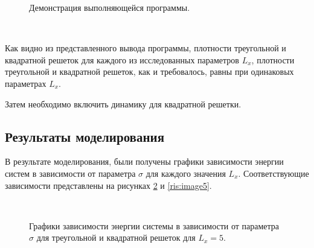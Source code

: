 \documentclass[14pt,a4paper,report]{ncc}
\begin{document}
\begin{figure}[h]
\caption{Демонстрация выполняющейся программы.}
\label{ris:image3}
\end{figure}
\

Как видно из представленного вывода программы, плотности треугольной и квадратной решеток для каждого из исследованных параметров $L_x$, плотности треугольной и квадратной решеток, как и требовалось, равны при одинаковых параметрах $L_x$.
\

Затем необходимо включить динамику для квадратной решетки. 

 \subsection{Результаты моделирования}
В результате моделирования, были получены графики зависимости энергии систем в зависимости от параметра $\sigma$ для каждого значения $L_x$. Соответствующие зависимости представлены на рисунках \ref{ris:image4} и \ref{ris:image5}.


 \
 
 \begin{figure}[h]
\caption{Графики зависимости энергии системы в зависимости от параметра $\sigma$ для треугольной и квадратной решеток для $L_x=5$.}
\label{ris:image4}
\end{figure}
\
\end{document}
